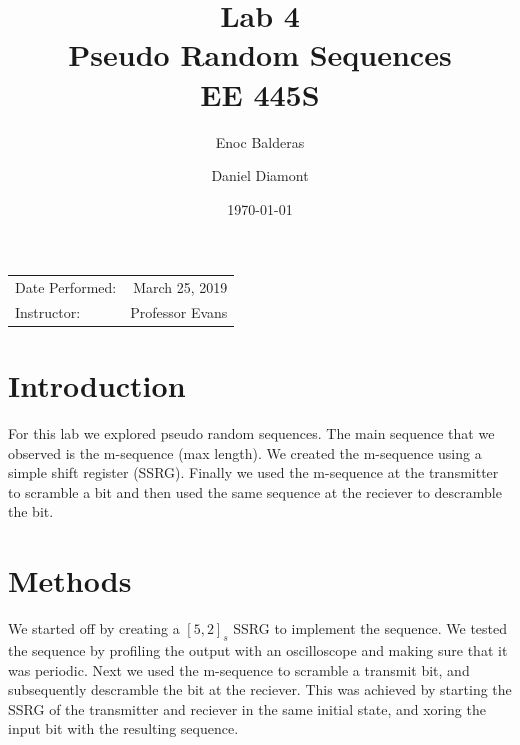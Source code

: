 \documentclass{article}
\title{Lab 4\\ Pseudo Random Sequences\\ EE 445S} %
\author{Enoc Balderas\\
        \and
        Daniel Diamont\\} %
\date{\today} %
\begin{document}
\maketitle %

\begin{center}
\begin{tabular}{l r}
Date Performed: & March 25, 2019 \\ %
Instructor: & Professor Evans %
\end{tabular}
\end{center}



\section{Introduction}

For this lab we explored pseudo random sequences.
The main sequence that we observed is the m-sequence (max length).
We created the m-sequence using a simple shift register (SSRG).
Finally we used the m-sequence at the transmitter to scramble a bit and then used the same sequence at the reciever to descramble the bit.


\section{Methods}

We started off by creating a $[5,2]_s$ SSRG to implement the sequence.
We tested the sequence by profiling the output with an oscilloscope and making sure that it was periodic.
Next we used the m-sequence to scramble a transmit bit, and subsequently descramble the bit at the reciever.
This was achieved by starting the SSRG of the transmitter and reciever in the same initial state, and xoring the input bit with the resulting sequence.
\end{document}
